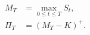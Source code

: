 \documentclass{equation-sheet}
\begin{document}
\begin{equation*}
\begin{aligned}
M_T &= \max_{0\leq t\leq T} S_t, \\[0.75em]
\Pi_T &= (M_T-K)^{+}.
\end{aligned}
\end{equation*}
\end{document}

